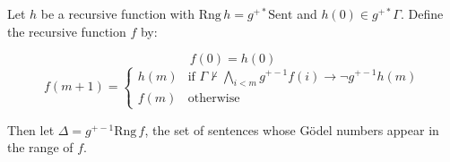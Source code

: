 Let $h$ be a recursive function with $\text{Rng}\,h = g^{+*} \text{Sent}$ and $h(0) \in g^{+*} \Gamma$. Define the recursive function $f$ by:

$$f(0) = h(0)$$
$$f(m + 1) = \begin{cases}
h(m) & \text{if } \Gamma \not\vdash \bigwedge_{i < m} g^{+-1} f(i) \rightarrow \neg g^{+-1} h(m) \\
f(m) & \text{otherwise}
\end{cases}$$

Then let $\Delta = g^{+-1} \text{Rng}\,f$, the set of sentences whose Gödel numbers appear in the range of $f$.
